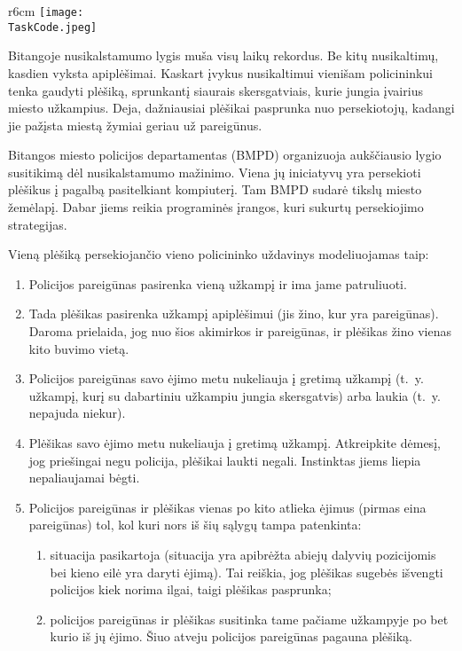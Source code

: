 \documentclass{boi2014-lt}
\renewcommand{\TaskCode}{coprobber}
\begin{document}
    \begin{wrapfigure}[11]{r}{6cm}
		\texttt{[image: \\TaskCode.jpeg]}
	\end{wrapfigure}

	Bitangoje nusikalstamumo lygis muša visų laikų rekordus. Be kitų
	nusikaltimų, kasdien vyksta apiplėšimai. Kaskart įvykus nusikaltimui vienišam
	policininkui tenka gaudyti plėšiką, sprunkantį siaurais skersgatviais, kurie
	jungia įvairius miesto užkampius. Deja, dažniausiai plėšikai
	pasprunka nuo persekiotojų, kadangi jie pažįsta miestą žymiai geriau už
	pareigūnus.

	Bitangos miesto policijos departamentas (BMPD) organizuoja aukščiausio
	lygio susitikimą dėl nusikalstamumo mažinimo. Viena jų iniciatyvų yra
	persekioti plėšikus į pagalbą pasitelkiant kompiuterį. Tam BMPD sudarė
	tikslų miesto žemėlapį. Dabar jiems reikia programinės įrangos, kuri
	sukurtų persekiojimo strategijas.

	Vieną plėšiką persekiojančio vieno policininko uždavinys modeliuojamas taip:
	\begin{enumerate}
		\item Policijos pareigūnas pasirenka vieną užkampį ir ima jame
			patruliuoti.
		\item Tada plėšikas pasirenka užkampį apiplėšimui (jis žino, kur yra
			pareigūnas). Daroma prielaida, jog nuo šios akimirkos ir
			pareigūnas, ir plėšikas žino vienas kito buvimo vietą.
		\item Policijos pareigūnas savo ėjimo metu nukeliauja į gretimą užkampį
			(t.~y. užkampį, kurį su dabartiniu užkampiu jungia skersgatvis)
			arba laukia (t.~y. nepajuda niekur).
		\item Plėšikas savo ėjimo metu nukeliauja į gretimą užkampį. Atkreipkite
			dėmesį, jog priešingai negu policija, plėšikai laukti negali.
			Instinktas jiems liepia nepaliaujamai bėgti.
		\item Policijos pareigūnas ir plėšikas vienas po kito atlieka ėjimus
			(pirmas eina pareigūnas) tol, kol kuri nors iš šių sąlygų tampa
			patenkinta:
			\begin{enumerate}
				\item situacija pasikartoja (situacija yra apibrėžta abiejų
					dalyvių pozicijomis bei kieno eilė yra daryti ėjimą).
					Tai reiškia, jog plėšikas sugebės išvengti policijos
					kiek norima ilgai, taigi plėšikas pasprunka;
				\item policijos pareigūnas ir plėšikas susitinka tame pačiame
					užkampyje po bet kurio iš jų ėjimo. Šiuo atveju policijos
					pareigūnas pagauna plėšiką.
			\end{enumerate}
	\end{enumerate}
\end{document}
